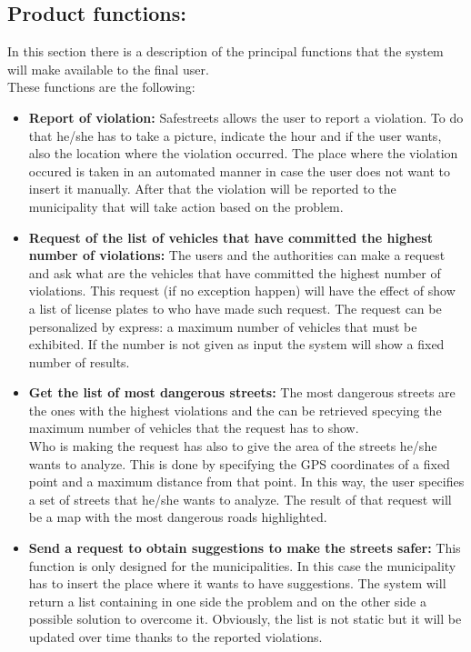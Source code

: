 \documentclass[titlepage]{article}
\begin{document}
\subsection{Product functions: }
In this section there is a description of the principal functions that the system will make available to the final user.\\
These functions are the following:
\begin{itemize}
	\item \textbf{Report of violation:} Safestreets allows the user to report a violation. To do that he/she has to take a picture, indicate the hour and if the user wants, also the location where the violation occurred. The place where the violation occured is taken in an automated manner in case the user does not want to insert it manually. After that the violation will be reported to the municipality that will take action based on the problem.
	\item \textbf{Request of the list of vehicles that have committed the highest number of violations:}
	The users and the authorities can make a request and ask what are the vehicles that have committed the highest number of violations. This request (if no exception happen) will have the effect of show a list of license plates to who have made such request. The request can be personalized by express: a maximum number of vehicles that must be exhibited. If the number is not given as input the system will show a fixed number of results.
	\item \textbf{Get the list of most dangerous streets: }
	The most dangerous streets are the ones with the highest violations and the can be retrieved specying the maximum number of vehicles that the request has to show. \\
Who is making the request has also to give the area of the streets he/she wants to analyze. This is done by specifying the GPS coordinates of a fixed point and a maximum distance from that point. In this way, the user specifies a set of streets that he/she wants to analyze. The result of that request will be a map with the most dangerous roads highlighted.
	\item \textbf{Send a request to obtain suggestions to make the streets safer:}
	This function is only designed for the municipalities. In this case the municipality has to insert the place where it wants to have suggestions. The system will return a list containing in one side the problem and on the other side a possible solution to overcome it. Obviously, the list is not static but it will be updated over time thanks to the reported violations.

\end{itemize}
\end{document}

